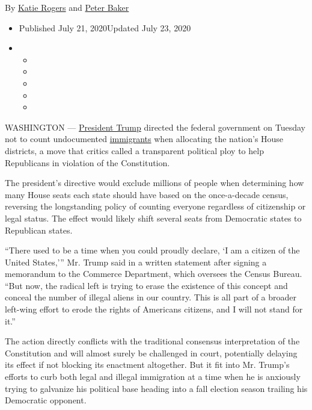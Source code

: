 By \href{https://www.nytimes.com/by/katie-rogers}{Katie Rogers} and
\href{https://www.nytimes.com/by/peter-baker}{Peter Baker}

\begin{itemize}
\item
  Published July 21, 2020Updated July 23, 2020
\item
  \begin{itemize}
  \item
  \item
  \item
  \item
  \item
  \end{itemize}
\end{itemize}

WASHINGTON ---
\href{https://www.nytimes.com/2020/07/23/us/trump-immigration-nation-netflix.html}{President
Trump} directed the federal government on Tuesday not to count
undocumented
\href{https://www.nytimes.com/2020/07/23/us/trump-immigration-nation-netflix.html}{immigrants}
when allocating the nation's House districts, a move that critics called
a transparent political ploy to help Republicans in violation of the
Constitution.

The president's directive would exclude millions of people when
determining how many House seats each state should have based on the
once-a-decade census, reversing the longstanding policy of counting
everyone regardless of citizenship or legal status. The effect would
likely shift several seats from Democratic states to Republican states.

``There used to be a time when you could proudly declare, `I am a
citizen of the United States,''' Mr. Trump said in a written statement
after signing a memorandum to the Commerce Department, which oversees
the Census Bureau. ``But now, the radical left is trying to erase the
existence of this concept and conceal the number of illegal aliens in
our country. This is all part of a broader left-wing effort to erode the
rights of Americans citizens, and I will not stand for it.''

The action directly conflicts with the traditional consensus
interpretation of the Constitution and will almost surely be challenged
in court, potentially delaying its effect if not blocking its enactment
altogether. But it fit into Mr. Trump's efforts to curb both legal and
illegal immigration at a time when he is anxiously trying to galvanize
his political base heading into a fall election season trailing his
Democratic opponent.

